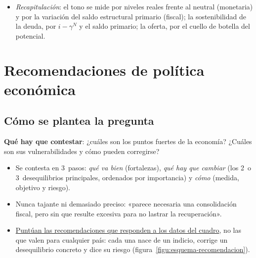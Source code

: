 \documentclass[11pt]{article}
\begin{document}
\begin{itemize}
\item \emph{Recapitulación}: el tono se mide por niveles reales frente al neutral (monetaria) y por la variación del saldo estructural primario (fiscal); la sostenibilidad de la deuda, por $i-\gamma^N$ y el saldo primario; la oferta, por el cuello de botella del potencial.
\end{itemize}


\section{Recomendaciones de política económica}\label{sec:recomendaciones}

\subsection{Cómo se plantea la pregunta}\label{sec:plantear}

\begin{ideaclave}
\textbf{Qué hay que contestar}: ¿cuáles son los puntos fuertes de la economía? ¿Cuáles son sus vulnerabilidades y cómo pueden corregirse?
\end{ideaclave}

\begin{itemize}
\item Se contesta en 3~pasos: \emph{qué va bien} (fortalezas), \emph{qué hay que cambiar} (los 2~o 3~desequilibrios principales, ordenados por importancia) y \emph{cómo} (medida, objetivo y riesgo).
\item Nunca tajante ni demasiado preciso: «parece necesaria una consolidación fiscal, pero sin que resulte excesiva para no lastrar la recuperación».
\item \uline{Puntúan las recomendaciones que responden a los datos del cuadro}, no las que valen para cualquier país: cada una nace de un indicio, corrige un desequilibrio concreto y dice su riesgo (figura~\ref{figu:esquema-recomendacion}).
\end{itemize}

\begin{infografia}[!htb]
\centering
\caption{Del dato a la recomendación}\label{figu:esquema-recomendacion}
\end{infografia}
\end{document}
